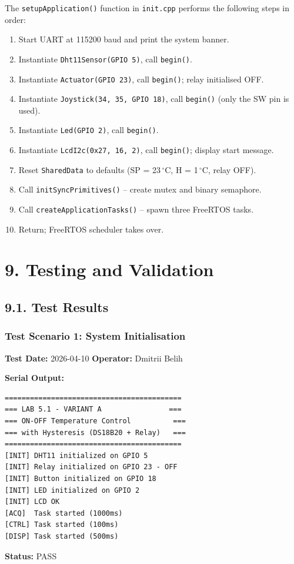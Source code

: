 \documentclass[12pt]{article}
\begin{document}
The \texttt{setupApplication()} function in \texttt{init.cpp} performs the
following steps in order:
\begin{enumerate}
    \item Start UART at 115200 baud and print the system banner.
    \item Instantiate \texttt{Dht11Sensor(GPIO 5)}, call \texttt{begin()}.
    \item Instantiate \texttt{Actuator(GPIO 23)}, call \texttt{begin()};
          relay initialised OFF.
    \item Instantiate \texttt{Joystick(34, 35, GPIO 18)}, call \texttt{begin()}
          (only the SW pin is used).
    \item Instantiate \texttt{Led(GPIO 2)}, call \texttt{begin()}.
    \item Instantiate \texttt{LcdI2c(0x27, 16, 2)}, call \texttt{begin()};
          display start message.
    \item Reset \texttt{SharedData} to defaults
          (SP = 23\,$^{\circ}$C, H = 1\,$^{\circ}$C, relay OFF).
    \item Call \texttt{initSyncPrimitives()} -- create mutex and binary semaphore.
    \item Call \texttt{createApplicationTasks()} -- spawn three FreeRTOS tasks.
    \item Return; FreeRTOS scheduler takes over.
\end{enumerate}

\section*{9. Testing and Validation}

\subsection*{9.1. Test Results}

\subsubsection*{Test Scenario 1: System Initialisation}

\textbf{Test Date:} 2026-04-10 \quad \textbf{Operator:} Dmitrii Belih

\textbf{Serial Output:}
\begin{verbatim}
==========================================
=== LAB 5.1 - VARIANT A                ===
=== ON-OFF Temperature Control          ===
=== with Hysteresis (DS18B20 + Relay)   ===
==========================================
[INIT] DHT11 initialized on GPIO 5
[INIT] Relay initialized on GPIO 23 - OFF
[INIT] Button initialized on GPIO 18
[INIT] LED initialized on GPIO 2
[INIT] LCD OK
[ACQ]  Task started (1000ms)
[CTRL] Task started (100ms)
[DISP] Task started (500ms)
\end{verbatim}
\textbf{Status:} PASS
\end{document}
